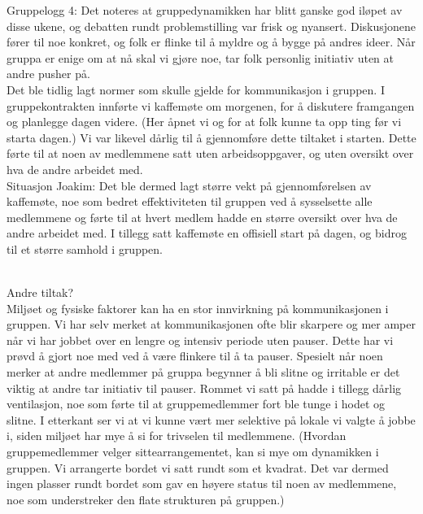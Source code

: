 Gruppelogg 4:
Det noteres at gruppedynamikken har blitt ganske god iløpet av disse ukene, og
debatten rundt problemstilling var frisk og nyansert. Diskusjonene fører til noe
konkret, og folk er flinke til å myldre og å bygge på andres ideer. Når gruppa
er enige om at nå skal vi gjøre noe, tar folk personlig initiativ uten at andre
pusher på.\\
Det ble tidlig lagt normer som skulle gjelde for kommunikasjon i gruppen. I gruppekontrakten innførte vi kaffemøte om morgenen, for å diskutere framgangen og planlegge dagen videre. (Her åpnet vi og for at folk kunne ta opp ting før vi starta dagen.) Vi var likevel dårlig til å gjennomføre dette tiltaket i starten. Dette førte til at noen av medlemmene satt uten arbeidsoppgaver, og uten oversikt over hva de andre arbeidet med. \\
Situasjon Joakim:
Det ble dermed lagt større vekt på gjennomførelsen av kaffemøte, noe som bedret effektiviteten til gruppen ved å sysselsette alle medlemmene og førte til at hvert medlem hadde en større oversikt over hva de andre arbeidet med. I tillegg satt kaffemøte en offisiell start på dagen, og bidrog til et større samhold i gruppen. \\\

Andre tiltak?\\

Miljøet og fysiske faktorer kan ha en stor innvirkning på kommunikasjonen i
gruppen. Vi har selv merket at kommunikasjonen ofte blir skarpere og mer amper
når vi har jobbet over en lengre og intensiv periode uten pauser. Dette har vi
prøvd å gjort noe med ved å være flinkere til å ta pauser. Spesielt når noen
merker at andre medlemmer på gruppa begynner å bli slitne og irritable er det
viktig at andre tar initiativ til pauser. Rommet vi satt på hadde i tillegg dårlig ventilasjon, noe som førte til at gruppemedlemmer fort ble tunge i hodet og slitne. I etterkant ser vi at vi kunne vært mer selektive på lokale vi valgte å jobbe i, siden miljøet har mye å si for trivselen til medlemmene.
(Hvordan gruppemedlemmer velger sittearrangementet, kan si mye om dynamikken i gruppen. Vi arrangerte bordet vi satt rundt som et kvadrat. Det var dermed ingen plasser rundt bordet som gav en høyere status til noen av medlemmene, noe som understreker den flate strukturen på gruppen.)\\

